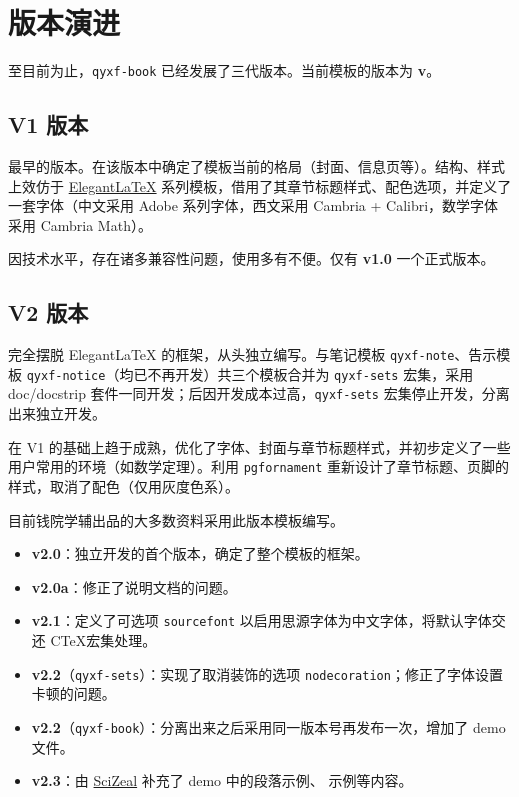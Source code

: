 \documentclass[
    10pt,
    oneside,
    openany,
    b5paper,
    colorscheme = black  %
]{qyxf-book}
\begin{document}
\section{版本演进}

至目前为止，\verb|qyxf-book| 已经发展了三代版本。当前模板的版本为 \textbf{v\styversion}。

\subsection{V1 版本}
最早的版本。在该版本中确定了模板当前的格局（封面、信息页等）。结构、样式上效仿于 \href{https://elegantlatex.org/}{Elegant\LaTeX} 系列模板，借用了其章节标题样式、配色选项，并定义了一套字体（中文采用 Adobe 系列字体，西文采用 Cambria + Calibri，数学字体采用 Cambria Math）。

因技术水平，存在诸多兼容性问题，使用多有不便。仅有 \textbf{v1.0} 一个正式版本。

\subsection{V2 版本}

完全摆脱 Elegant\LaTeX{} 的框架，从头独立编写。与笔记模板 \verb|qyxf-note|、告示模板 \verb|qyxf-notice|（均已不再开发）共三个模板合并为 \verb|qyxf-sets| 宏集，采用 doc/docstrip 套件一同开发；后因开发成本过高，\verb|qyxf-sets| 宏集停止开发，分离出来独立开发。

在 V1 的基础上趋于成熟，优化了字体、封面与章节标题样式，并初步定义了一些用户常用的环境（如数学定理）。利用 \verb|pgfornament| 重新设计了章节标题、页脚的样式，取消了配色（仅用灰度色系）。

目前钱院学辅出品的大多数资料采用此版本模板编写。

\begin{itemize}
  \item \textbf{v2.0}：独立开发的首个版本，确定了整个模板的框架。
  \item \textbf{v2.0a}：修正了说明文档的问题。
  \item \textbf{v2.1}：定义了可选项 \verb|sourcefont| 以启用思源字体为中文字体，将默认字体交还 C\TeX 宏集处理。
  \item \textbf{v2.2}（\verb|qyxf-sets|）：实现了取消装饰的选项 \verb|nodecoration|；修正了字体设置卡顿的问题。
  \item \textbf{v2.2}（\verb|qyxf-book|）：分离出来之后采用同一版本号再发布一次，增加了 demo 文件。
  \item \textbf{v2.3}：由 \href{https://github.com/SciZeal}{SciZeal} 补充了 demo 中的段落示例、 示例等内容。
\end{itemize}
\end{document}
